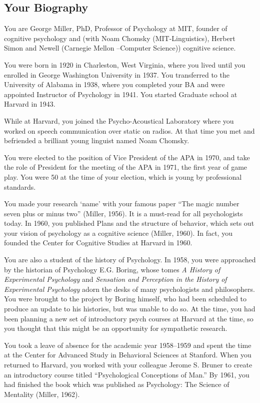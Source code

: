 \begin{refsection}
\section{Your Biography}
\label{yourbiography}

You are George Miller, PhD, Professor of Psychology at MIT, founder of cognitive psychology and (with Noam Chomsky (MIT-Linguistics), Herbert Simon and Newell (Carnegie Mellon –Computer Science)) cognitive science.

You were born in 1920 in Charleston, West Virginia, where you lived until you enrolled in George Washington University in 1937. You transferred to the University of Alabama in 1938, where you completed your BA and were appointed Instructor of Psychology in 1941. You started Graduate school at Harvard in 1943.

While at Harvard, you joined the Psycho-Acoustical Laboratory where you worked on speech communication over static on radios. At that time you met and befriended a brilliant young linguist named Noam Chomsky.

You were elected to the position of Vice President of the APA in 1970, and take the role of President for the meeting of the APA in 1971, the first year of game play. You were 50 at the time of your election, which is young by professional standards.

You made your research ‘name’ with your famous paper “The magic number seven plus or minus two” (Miller, 1956). It is a must-read for all psychologists today. In 1960, you published Plans and the structure of behavior, which sets out your vision of psychology as a cognitive science (Miller, 1960). In fact, you founded the Center for Cognitive Studies at Harvard in 1960.

You are also a student of the history of Psychology. In 1958, you were approached by the historian of Psychology E.G. Boring, whose tomes \emph{A History of Experimental Psychology} and \emph{Sensation and Perception in the History of Experimental Psychology} adorn the desks of many psychologists and philosophers. You were brought to the project by Boring himself, who had been scheduled to produce an update to his histories, but was unable to do so. At the time, you had been planning a new set of introductory psych courses at Harvard at the time, so you thought that this might be an opportunity for sympathetic research.

You took a leave of absence for the academic year 1958--1959 and spent the time at the Center for Advanced Study in Behavioral Sciences at Stanford. When you returned to Harvard, you worked with your colleague Jerome S. Bruner to create an introductory course titled “Psychological Conceptions of Man.” By 1961, you had finished the book which was published as Psychology: The Science of Mentality (Miller, 1962).


\end{refsection}
